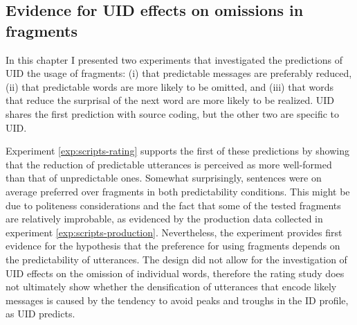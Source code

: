 \subsection{Evidence for UID effects on omissions in fragments}
In this chapter I presented two experiments that investigated the predictions of UID the usage of fragments: (i) that predictable messages are preferably reduced, (ii) that predictable words are more likely to be omitted, and (iii) that words that reduce the surprisal of the next word are more likely to be realized. UID shares the first prediction with source coding, but the other two are specific to UID.

Experiment \ref{exp:scripts-rating} supports the first of these predictions by showing that the reduction of predictable utterances is perceived as more well-formed than that of unpredictable ones. Somewhat surprisingly, sentences were on average preferred over fragments in both predictability conditions. This might be due to politeness considerations and the fact that some of the tested fragments are relatively improbable, as evidenced by the production data collected in experiment \ref{exp:scripts-production}. Nevertheless, the experiment provides first evidence for the hypothesis that the preference for using fragments depends on the predictability of utterances. The design did not allow for the investigation of UID effects on the omission of individual words, therefore the rating study does not ultimately show whether the densification of utterances that encode likely messages is caused by the tendency to avoid peaks and troughs in the ID profile, as UID predicts.

